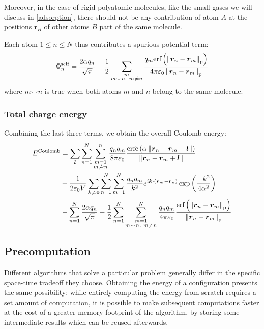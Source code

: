 \documentclass[main.tex]{subfiles}
\begin{document}
Moreover, in the case of rigid polyatomic molecules, like the small gases we will discuss in \autoref{adsorption}, there should not be any contribution of atom $A$ at the positions $\boldsymbol r_B$ of other atoms $B$ part of the same molecule.

Each atom $1\le n\le N$ thus contributes a spurious potential term:
\[\Phi^\text{self}_n = \frac{2\alpha q_n}{\sqrt\pi} + \frac12\sum_{\substack{m\\m\smile n,\ m\not\kern0.2ex= n}}\frac{q_m\text{erf}\left(\left\|\boldsymbol r_n - \boldsymbol r_m\right\|_\text{p}\right)}{4\pi\varepsilon_0\left\|\boldsymbol r_n - \boldsymbol r_m\right\|_\text{p}}\]
where $m\smile n$ is true when both atoms $m$ and $n$ belong to the same molecule.

\subsubsection{Total charge energy}

Combining the last three terms, we obtain the overall Coulomb energy:
\[\begin{split}
E^\text{Coulomb} &= \sum_{\boldsymbol l} \sum_{n=1}^N\sum_{\substack{m=1\\m\not\smile n}}^n \frac{q_n q_m}{8\pi\varepsilon_0}\frac{\text{erfc}\left(\alpha\left\|\boldsymbol r_n - \boldsymbol r_m + \boldsymbol l\right\|\right)}{\left\|\boldsymbol r_n - \boldsymbol r_m + \boldsymbol l\right\|}
\\&+ \frac1{2\varepsilon_0V} \sum_{\boldsymbol{k}\not\kern0.2ex=\boldsymbol{0}}\sum_{n=1}^N\sum_{m=1}^N \frac{q_n q_m}{k^2}e^{i\boldsymbol k\cdot\left(\boldsymbol r_m - \boldsymbol r_n\right)}\exp\left(\frac{-k^2}{4\alpha^2}\right)
\\&- \sum_{n=1}^N\frac{2\alpha q_n}{\sqrt\pi} - \frac12\sum_{n=1}^N\sum_{\substack{m=1\\m\smile n,\ m\not\kern0.2ex= n}}^N \frac{q_n q_m}{4\pi\varepsilon_0}\frac{\text{erf}\left(\left\|\boldsymbol r_n - \boldsymbol r_m\right\|_\text{p}\right)}{\left\|\boldsymbol r_n - \boldsymbol r_m\right\|_\text{p}}
\end{split}\]

\subsection{Precomputation}

Different algorithms that solve a particular problem generally differ in the specific space-time tradeoff they choose. Obtaining the energy of a configuration presents the same possibility: while entirely computing the energy from scratch requires a set amount of computation, it is possible to make subsequent computations faster at the cost of a greater memory footprint of the algorithm, by storing some intermediate results which can be reused afterwards.
\end{document}
